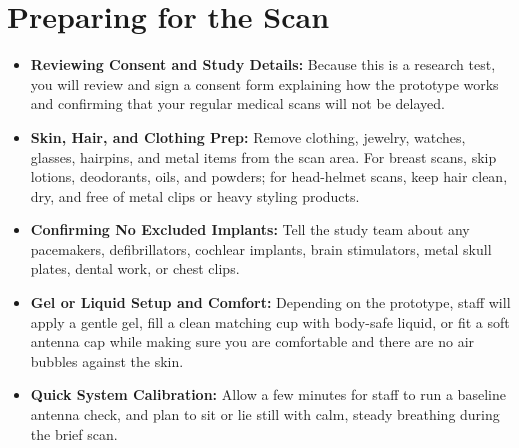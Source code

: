 \section{Preparing for the Scan}
\begin{itemize}
  \item \textbf{Reviewing Consent and Study Details:} Because this is a research test, you will review and sign a consent form explaining how the prototype works and confirming that your regular medical scans will not be delayed.
  \item \textbf{Skin, Hair, and Clothing Prep:} Remove clothing, jewelry, watches, glasses, hairpins, and metal items from the scan area. For breast scans, skip lotions, deodorants, oils, and powders; for head-helmet scans, keep hair clean, dry, and free of metal clips or heavy styling products.
  \item \textbf{Confirming No Excluded Implants:} Tell the study team about any pacemakers, defibrillators, cochlear implants, brain stimulators, metal skull plates, dental work, or chest clips.
  \item \textbf{Gel or Liquid Setup and Comfort:} Depending on the prototype, staff will apply a gentle gel, fill a clean matching cup with body-safe liquid, or fit a soft antenna cap while making sure you are comfortable and there are no air bubbles against the skin.
  \item \textbf{Quick System Calibration:} Allow a few minutes for staff to run a baseline antenna check, and plan to sit or lie still with calm, steady breathing during the brief scan.
\end{itemize}

